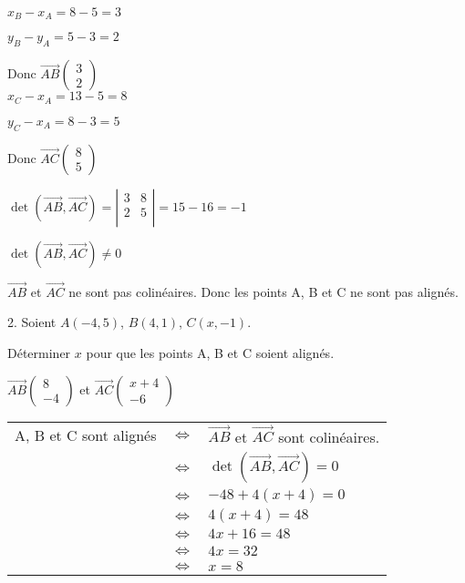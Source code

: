 $x_B - x_A = 8 - 5 = 3 $

$ y_B - y_A = 5 - 3 = 2 $

Donc $\overrightarrow{AB}\left(\begin{array}{c} 3\\ 2 \end{array}\right)$ \\

$ x_C - x_A = 13 - 5 = 8 $

$ y_C - x_A = 8 - 3 = 5 $

Donc $\overrightarrow{AC}\left(\begin{array}{c} 8\\ 5 \end{array}\right)$

$\det\left(\overrightarrow{AB}, \overrightarrow{AC}\right) = \left| \begin{array}{cc}  3 & 8 \\ 2 & 5  \\ \end{array} \right| = 15- 16 = -1 $

$\det\left(\overrightarrow{AB}, \overrightarrow{AC}\right) \neq 0 $

$\overrightarrow{AB}$ et $ \overrightarrow{AC}$ ne sont pas colinéaires. Donc les points A, B et C ne sont pas alignés. \\

\newpage

2. Soient $A\left(-4,5\right)$, $B\left(4,1\right)$, $C\left(x,-1\right)$.

Déterminer $x$ pour que les points A, B et C soient alignés.

$\overrightarrow{AB}\left(\begin{array}{c} 8\\ -4 \end{array}\right)$ et $\overrightarrow{AC}\left(\begin{array}{c} x+4\\ -6 \end{array}\right)$

\begin{tabular}{lll}
A, B et C sont alignés & $\Longleftrightarrow $ & $\overrightarrow{AB}$ et $\overrightarrow{AC}$ sont colinéaires. \\
& $\Longleftrightarrow$ & $\det\left(\overrightarrow{AB}, \overrightarrow{AC} \right) = 0 $ \\
& $\Longleftrightarrow$ & $-48 + 4\left(x+4\right) = 0$ \\
& $\Longleftrightarrow$ & $4\left(x+4\right) = 48 $ \\
& $ \Longleftrightarrow$ & $4x + 16 = 48$ \\
& $ \Longleftrightarrow$ & $4x = 32$ \\
& $\Longleftrightarrow $ & $x = 8 $ \\
\end{tabular}

